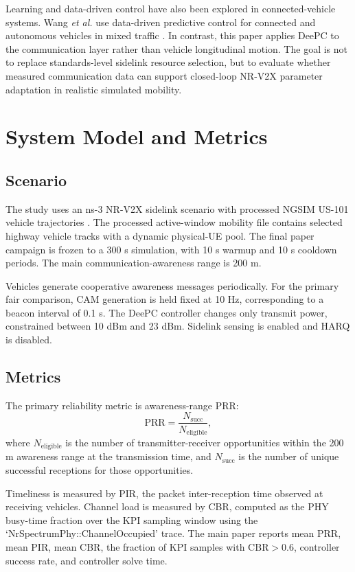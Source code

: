 \documentclass[conference]{IEEEtran}
\newcommand{\prr}{\mathrm{PRR}}
\newcommand{\cbr}{\mathrm{CBR}}
\begin{document}
Learning and data-driven control have also been explored in connected-vehicle systems. Wang \emph{et al.} use data-driven predictive control for connected and autonomous vehicles in mixed traffic \cite{wang2021datadriven}. In contrast, this paper applies DeePC to the communication layer rather than vehicle longitudinal motion. The goal is not to replace standards-level sidelink resource selection, but to evaluate whether measured communication data can support closed-loop NR-V2X parameter adaptation in realistic simulated mobility.

\section{System Model and Metrics}

\subsection{Scenario}

The study uses an ns-3 NR-V2X sidelink scenario with processed NGSIM US-101 vehicle trajectories \cite{ngsim}. The processed active-window mobility file contains selected highway vehicle tracks with a dynamic physical-UE pool. The final paper campaign is frozen to a 300 s simulation, with 10 s warmup and 10 s cooldown periods. The main communication-awareness range is 200 m.

Vehicles generate cooperative awareness messages periodically. For the primary fair comparison, CAM generation is held fixed at 10 Hz, corresponding to a beacon interval of 0.1 s. The DeePC controller changes only transmit power, constrained between 10 dBm and 23 dBm. Sidelink sensing is enabled and HARQ is disabled.

\subsection{Metrics}

The primary reliability metric is awareness-range PRR:
\begin{equation}
\prr = \frac{N_{\mathrm{succ}}}{N_{\mathrm{eligible}}},
\end{equation}
where $N_{\mathrm{eligible}}$ is the number of transmitter-receiver opportunities within the 200 m awareness range at the transmission time, and $N_{\mathrm{succ}}$ is the number of unique successful receptions for those opportunities.

Timeliness is measured by PIR, the packet inter-reception time observed at receiving vehicles. Channel load is measured by CBR, computed as the PHY busy-time fraction over the KPI sampling window using the `NrSpectrumPhy::ChannelOccupied' trace. The main paper reports mean PRR, mean PIR, mean CBR, the fraction of KPI samples with $\cbr > 0.6$, controller success rate, and controller solve time.
\end{document}
